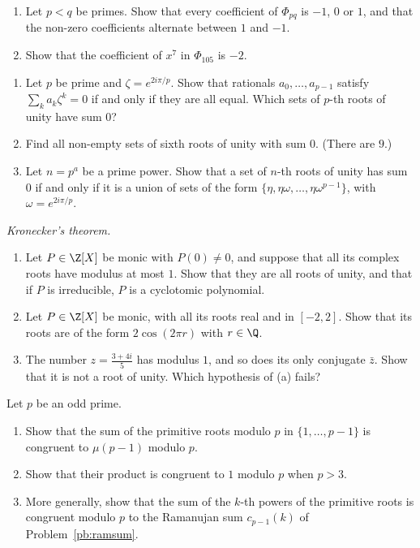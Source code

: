 \begin{exercise}[$\star\star\star$]\label{pb:phipq}
\begin{enumerate}[label=(\alph*)]
\item Let $p<q$ be primes. Show that every coefficient of $\Phi_{pq}$ is $-1$, $0$ or $1$, and that the non-zero
coefficients alternate between $1$ and $-1$.
\item Show that the coefficient of $x^7$ in $\Phi_{105}$ is $-2$.
\end{enumerate}
\end{exercise}

\begin{exercise}[$\star\star$]\label{pb:vanish}
\begin{enumerate}[label=(\alph*)]
\item Let $p$ be prime and $\zeta=e^{2i\pi/p}$. Show that rationals $a_0,\dots,a_{p-1}$ satisfy $\sum_ka_k\zeta^k=0$ if and
only if they are all equal. Which sets of $p$-th roots of unity have sum $0$?
\item Find all non-empty sets of sixth roots of unity with sum $0$. (There are $9$.)
\item Let $n=p^a$ be a prime power. Show that a set of $n$-th roots of unity has sum $0$ if and only if it is a union of
sets of the form $\{\eta,\eta\omega,\dots,\eta\omega^{p-1}\}$, with $\omega=e^{2i\pi/p}$.
\end{enumerate}
\end{exercise}

\begin{exercise}[$\star\star\star$]\label{pb:kronecker}
\emph{Kronecker's theorem.}
\begin{enumerate}[label=(\alph*)]
\item Let $P\in\Z[X]$ be monic with $P(0)\ne0$, and suppose that all its complex roots have modulus at most $1$. Show
that they are all roots of unity, and that if $P$ is irreducible, $P$ is a cyclotomic polynomial.
\item Let $P\in\Z[X]$ be monic, with all its roots real and in $[-2,2]$. Show that its roots are of the form $2\cos(2\pi r)$
with $r\in\Q$.
\item The number $z=\frac{3+4i}5$ has modulus $1$, and so does its only conjugate $\bar z$. Show that it is not a root of
unity. Which hypothesis of (a) fails?
\end{enumerate}
\end{exercise}

\begin{exercise}[$\star\star$]\label{pb:primsum}
Let $p$ be an odd prime.
\begin{enumerate}[label=(\alph*)]
\item Show that the sum of the primitive roots modulo $p$ in $\{1,\dots,p-1\}$ is congruent to $\mu(p-1)$ modulo $p$.
\item Show that their product is congruent to $1$ modulo $p$ when $p>3$.
\item More generally, show that the sum of the $k$-th powers of the primitive roots is congruent modulo $p$ to the
Ramanujan sum $c_{p-1}(k)$ of Problem~\ref{pb:ramsum}.
\end{enumerate}
\end{exercise}

